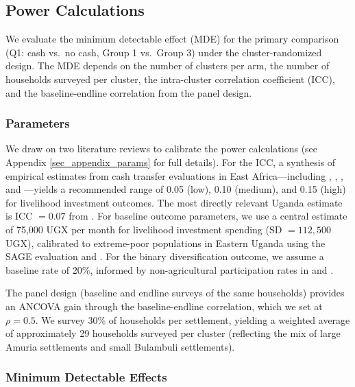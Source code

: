 \documentclass[12pt, oneside]{amsart}
\numberwithin{equation}{section}
\begin{document}
\subsection{\label{sec_power}Power Calculations}

We evaluate the minimum detectable effect (MDE) for the primary comparison (Q1: cash vs.\ no cash, Group 1 vs.\ Group 3) under the cluster-randomized design. The MDE depends on the number of clusters per arm, the number of households surveyed per cluster, the intra-cluster correlation coefficient (ICC), and the baseline-endline correlation from the panel design.

\subsubsection{Parameters}

We draw on two literature reviews to calibrate the power calculations (see Appendix \ref{sec_appendix_params} for full details). For the ICC, a synthesis of empirical estimates from cash transfer evaluations in East Africa---including \citet{haushofer2016short}, \citet{mcintosh2022cash}, \citet{egger2022general}, and \citet{aggarwal2023}---yields a recommended range of 0.05 (low), 0.10 (medium), and 0.15 (high) for livelihood investment outcomes. The most directly relevant Uganda estimate is ICC $= 0.07$ from \citet{icancar2025}. For baseline outcome parameters, we use a central estimate of 75,000 UGX per month for livelihood investment spending (SD $= 112{,}500$ UGX), calibrated to extreme-poor populations in Eastern Uganda using the SAGE evaluation \citep{sage2012} and \citet{blattman2014}. For the binary diversification outcome, we assume a baseline rate of 20\%, informed by non-agricultural participation rates in \citet{aggarwal2023} and \citet{mcintosh2022cash}.

The panel design (baseline and endline surveys of the same households) provides an ANCOVA gain through the baseline-endline correlation, which we set at $\rho = 0.5$. We survey 30\% of households per settlement, yielding a weighted average of approximately 29 households surveyed per cluster (reflecting the mix of large Amuria settlements and small Bulambuli settlements).

\subsubsection{Minimum Detectable Effects}
\end{document}
